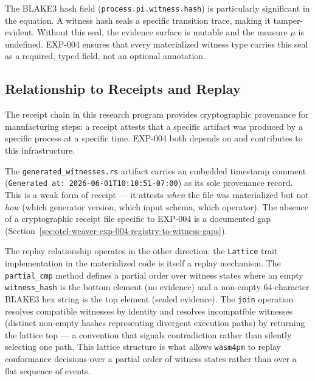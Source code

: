 The BLAKE3 hash field (\texttt{process.pi.witness.hash}) is particularly significant in
the equation. A witness hash seals a specific transition trace, making it tamper-evident.
Without this seal, the evidence surface is mutable and the measure $\mu$ is undefined.
EXP-004 ensures that every materialized witness type carries this seal as a required,
typed field, not an optional annotation.

\subsection{Relationship to Receipts and Replay}
\label{sec:otel-weaver-exp-004-registry-to-witness-receipts}

The receipt chain in this research program provides cryptographic provenance for
manufacturing steps: a receipt attests that a specific artifact was produced by a specific
process at a specific time. EXP-004 both depends on and contributes to this infrastructure.

The \texttt{generated\_witnesses.rs} artifact carries an embedded timestamp comment
(\texttt{Generated at: 2026-06-01T10:10:51-07:00}) as its sole provenance record. This is
a weak form of receipt --- it attests \emph{when} the file was materialized but not
\emph{how} (which generator version, which input schema, which operator). The absence of a
cryptographic receipt file specific to EXP-004 is a documented gap
(Section~\ref{sec:otel-weaver-exp-004-registry-to-witness-gaps}).

The replay relationship operates in the other direction: the \texttt{Lattice} trait
implementation in the materialized code is itself a replay mechanism. The
\texttt{partial\_cmp} method defines a partial order over witness states where an empty
\texttt{witness\_hash} is the bottom element (no evidence) and a non-empty 64-character
BLAKE3 hex string is the top element (sealed evidence). The \texttt{join} operation
resolves compatible witnesses by identity and resolves incompatible witnesses (distinct
non-empty hashes representing divergent execution paths) by returning the lattice top ---
a convention that signals contradiction rather than silently selecting one path. This
lattice structure is what allows \texttt{wasm4pm} to replay conformance decisions over
a partial order of witness states rather than over a flat sequence of events.
